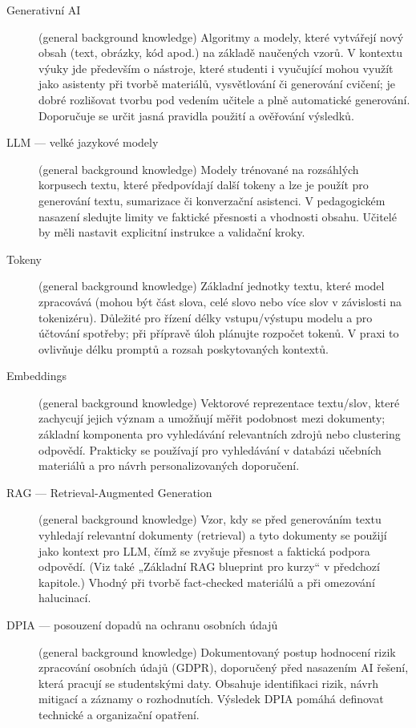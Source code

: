 \documentclass{report}%
\begin{document}
\begin{description}
  \item[Generativní AI] (general background knowledge) Algoritmy a modely, které vytvářejí nový obsah (text, obrázky, kód apod.) na základě naučených vzorů. V kontextu výuky jde především o nástroje, které studenti i vyučující mohou využít jako asistenty při tvorbě materiálů, vysvětlování či generování cvičení; je dobré rozlišovat tvorbu pod vedením učitele a plně automatické generování. Doporučuje se určit jasná pravidla použití a ověřování výsledků.
  \item[LLM — velké jazykové modely] (general background knowledge) Modely trénované na rozsáhlých korpusech textu, které předpovídají další tokeny a lze je použít pro generování textu, sumarizace či konverzační asistenci. V pedagogickém nasazení sledujte limity ve faktické přesnosti a vhodnosti obsahu. Učitelé by měli nastavit explicitní instrukce a validační kroky.
  \item[Tokeny] (general background knowledge) Základní jednotky textu, které model zpracovává (mohou být část slova, celé slovo nebo více slov v závislosti na tokenizéru). Důležité pro řízení délky vstupu/výstupu modelu a pro účtování spotřeby; při přípravě úloh plánujte rozpočet tokenů. V praxi to ovlivňuje délku promptů a rozsah poskytovaných kontextů.
  \item[Embeddings] (general background knowledge) Vektorové reprezentace textu/slov, které zachycují jejich význam a umožňují měřit podobnost mezi dokumenty; základní komponenta pro vyhledávání relevantních zdrojů nebo clustering odpovědí. Prakticky se používají pro vyhledávání v databázi učebních materiálů a pro návrh personalizovaných doporučení.
  \item[RAG — Retrieval‑Augmented Generation] (general background knowledge) Vzor, kdy se před generováním textu vyhledají relevantní dokumenty (retrieval) a tyto dokumenty se použijí jako kontext pro LLM, čímž se zvyšuje přesnost a faktická podpora odpovědí. (Viz také „Základní RAG blueprint pro kurzy“ v předchozí kapitole.) Vhodný při tvorbě fact‑checked materiálů a při omezování halucinací.
  \item[DPIA — posouzení dopadů na ochranu osobních údajů] (general background knowledge) Dokumentovaný postup hodnocení rizik zpracování osobních údajů (GDPR), doporučený před nasazením AI řešení, která pracují se studentskými daty. Obsahuje identifikaci rizik, návrh mitigací a záznamy o rozhodnutích. Výsledek DPIA pomáhá definovat technické a organizační opatření.

\end{description}
\end{document}
